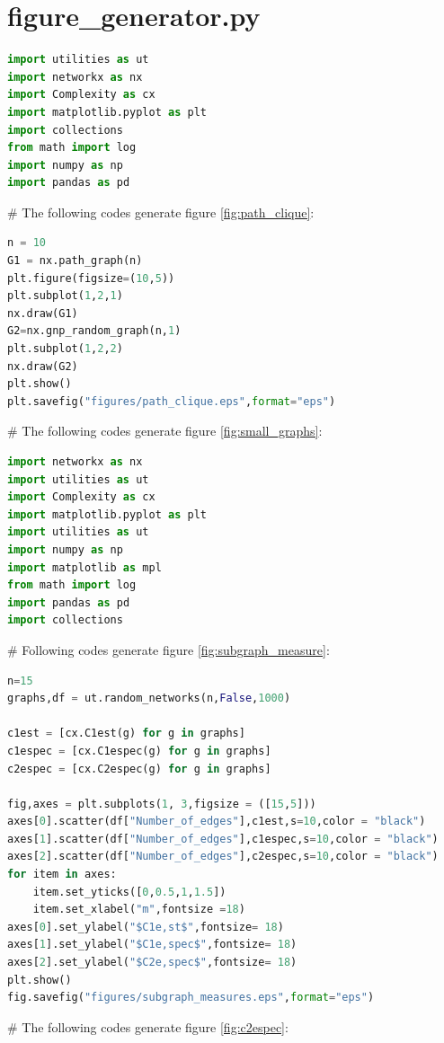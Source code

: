 \documentclass[12pt]{article}
\begin{document}
\section{figure\_generator.py}
\begin{lstlisting}[breaklines=true,language=Python]
import utilities as ut
import networkx as nx
import Complexity as cx
import matplotlib.pyplot as plt
import collections
from math import log
import numpy as np
import pandas as pd
\end{lstlisting}
\label{figure_generator}
\# The following codes generate figure \ref{fig:path_clique}:
\begin{lstlisting}[breaklines=true,language=Python]
n = 10
G1 = nx.path_graph(n)
plt.figure(figsize=(10,5))
plt.subplot(1,2,1)
nx.draw(G1)
G2=nx.gnp_random_graph(n,1)
plt.subplot(1,2,2)
nx.draw(G2)
plt.show()
plt.savefig("figures/path_clique.eps",format="eps")
\end{lstlisting}
\# The following codes generate figure \ref{fig:small_graphs}:
\begin{lstlisting}[breaklines=true,language=Python]
import networkx as nx
import utilities as ut
import Complexity as cx
import matplotlib.pyplot as plt
import utilities as ut
import numpy as np
import matplotlib as mpl
from math import log
import pandas as pd
import collections
\end{lstlisting}
\noindent
\newline
\# Following codes generate figure \ref{fig:subgraph_measure}:
\begin{lstlisting}[breaklines=true,language=Python]
n=15
graphs,df = ut.random_networks(n,False,1000)

c1est = [cx.C1est(g) for g in graphs]
c1espec = [cx.C1espec(g) for g in graphs]
c2espec = [cx.C2espec(g) for g in graphs]

fig,axes = plt.subplots(1, 3,figsize = ([15,5]))
axes[0].scatter(df["Number_of_edges"],c1est,s=10,color = "black")
axes[1].scatter(df["Number_of_edges"],c1espec,s=10,color = "black")
axes[2].scatter(df["Number_of_edges"],c2espec,s=10,color = "black")
for item in axes:
    item.set_yticks([0,0.5,1,1.5])
    item.set_xlabel("m",fontsize =18)
axes[0].set_ylabel("$C1e,st$",fontsize= 18)
axes[1].set_ylabel("$C1e,spec$",fontsize= 18)
axes[2].set_ylabel("$C2e,spec$",fontsize= 18)
plt.show()
fig.savefig("figures/subgraph_measures.eps",format="eps")
\end{lstlisting}
\noindent
\newline
\# The following codes generate figure \ref{fig:c2espec}:
\end{document}
